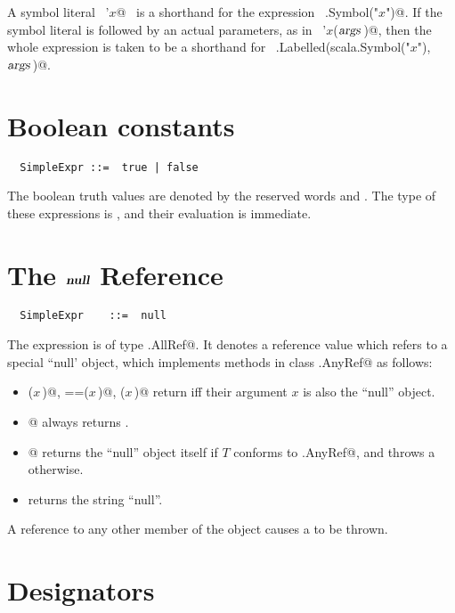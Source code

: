 \documentclass[a4paper,12pt,twoside,titlepage]{book}
\newcommand{\args}{\mbox{\sl args}}
\begin{document}
A symbol literal ~\lstinline@'$x$@~ is a shorthand for the expression
~\lstinline@scala.Symbol("$x$")@. If the symbol literal is followed by an
actual parameters, as in ~\lstinline@'$x$($\args\,$)@, then the whole expression
is taken to be a shorthand for
~\lstinline@scala.Labelled(scala.Symbol("$x$"), $\args\,$)@.

\section{Boolean constants}

\begin{lstlisting}
  SimpleExpr ::=  true | false
\end{lstlisting}

The boolean truth values are denoted by the reserved words 
and . The type of these expressions is , and
their evaluation is immediate. 

\section{The $\mbox{\sl\bfseries null}$ Reference}

\syntax\begin{lstlisting}
  SimpleExpr    ::=  null
\end{lstlisting}

The  expression is of type \lstinline@scala.AllRef@. It
denotes a reference value which refers to a special ``null' object,
which implements methods in class \lstinline@scala.AnyRef@ as follows:
\begin{itemize}
\item
\lstinline@eq($x\,$)@, \lstinline@==($x\,$)@, \lstinline@equals($x\,$)@ return  iff their
argument $x$ is also the ``null'' object.
\item
\lstinline@isInstanceOf[$T\,$]@ always returns .
\item
\lstinline@asInstanceOf[$T\,$]@ returns the ``null'' object itself if
$T$ conforms to \lstinline@scala.AnyRef@, and throws a
\lstinline@NullPointerExcetpion@ otherwise.
\item
{} returns the string ``null''.
\end{itemize}
A reference to any other member of the  object causes a
 to be thrown. 

\section{Designators}
\label{sec:designators}
\end{document}
